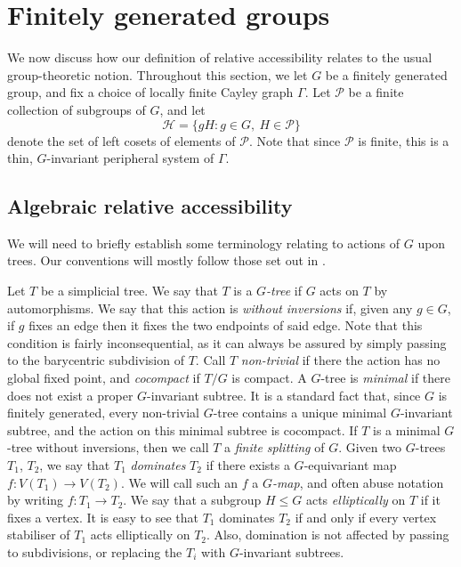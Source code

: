 \documentclass[11pt,a4paper]{amsart}
\theoremstyle{definition}
\newcommand{\per}{\mathcal{H}}
\begin{document}

\section{Finitely generated groups}\label{sec:groups}

We now discuss how our definition of relative accessibility relates to the usual group-theoretic notion. Throughout this section, we let $G$ be a finitely generated group, and fix a choice of locally finite Cayley graph $\Gamma$. Let $\mathcal P$ be a finite collection of subgroups of $G$, and let
$$
\per = \{gH : g \in G, \ H \in \mathcal P\}
$$
denote the set of left cosets of elements of $\mathcal P$. Note that since $\mathcal P$ is finite, this is a thin, $G$-invariant peripheral system of $\Gamma$. 

\subsection{Algebraic relative accessibility}

We will need to briefly establish some terminology relating to actions of $G$ upon trees. Our conventions will mostly follow those set out in \cite{jsj}. 

Let $T$ be a simplicial tree. We say that $T$ is a \emph{$G$-tree} if $G$ acts on $T$ by automorphisms. We say that this action is 
\emph{without inversions} if, given any $g \in G$, if $g$ fixes an edge then it fixes the two endpoints of said edge. Note that this condition is fairly inconsequential, as it can always be assured by simply passing to the barycentric subdivision of $T$.
Call $T$ \emph{non-trivial} if there the action has no global fixed point, and \emph{cocompact} if $T/G$ is compact. 
A $G$-tree is \emph{minimal} if there does not exist a proper $G$-invariant subtree. It is a standard fact that, since $G$ is finitely generated, every non-trivial $G$-tree contains a unique minimal $G$-invariant subtree, and the action on this minimal subtree is cocompact. 
If $T$ is a minimal $G$-tree without inversions, then we call $T$ a \emph{finite splitting} of $G$. 
Given two $G$-trees $T_1$, $T_2$, we say that $T_1$ \emph{dominates} $T_2$ if there exists a $G$-equivariant map $f : V(T_1) \to V(T_2)$. We will call such an $f$ a \emph{$G$-map}, and often abuse notation by writing $f : T_1 \to T_2$. 
We say that a subgroup $H \leq G$ acts \emph{elliptically} on $T$ if it fixes a vertex.
It is easy to see that $T_1$ dominates $T_2$ if and only if every vertex stabiliser of $T_1$ acts elliptically on $T_2$. Also, domination is not affected by passing to subdivisions, or replacing the $T_i$ with $G$-invariant subtrees. 
\end{document}

